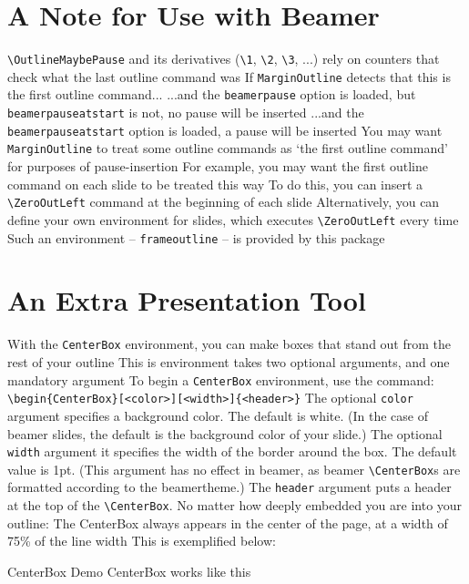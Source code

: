 \documentclass[11pt]{article}
\begin{document}
\section{A Note for Use with Beamer}\label{sec:frameoutline}
\1 \verb+\OutlineMaybePause+ and its derivatives (\verb+\1+, \verb+\2+, \verb+\3+, ...) rely on counters that check what the last outline command was
	\2 If \verb+MarginOutline+ detects that this is the first outline command...
		\3 ...and the \verb+beamerpause+ option is loaded, but \verb+beamerpauseatstart+ is not, no pause will be inserted
		\3 ...and the \verb+beamerpauseatstart+ option is loaded, a pause will be inserted
\1 You may want \verb+MarginOutline+ to treat some outline commands as `the first outline command' for purposes of pause-insertion
	\2 For example, you may want the first outline command on each slide to be treated this way
	\2 To do this, you can insert a \verb+\ZeroOutLeft+ command at the beginning of each slide
		\3 Alternatively, you can define your own environment for slides, which executes \verb+\ZeroOutLeft+ every time
		\3 Such an environment -- \verb+frameoutline+ -- is provided by this package

			
\section{An Extra Presentation Tool}\label{sec: centerbox}
\1 With the \verb+CenterBox+ environment, you can make boxes that stand out from the rest of your outline
	\2 This is environment takes two optional arguments, and one mandatory argument
\1 To begin a \verb+CenterBox+ environment, use the command:\\\verb+\begin{CenterBox}[<color>][<width>]{<header>}+
	\2 The optional \texttt{color} argument specifies a background color. The default is white.
		\3 (In the case of beamer slides, the default is the background color of your slide.)
	\2 The optional \texttt{width} argument it specifies the width of the border around the box. The default value is 1pt.
		\3 (This argument has no effect in beamer, as beamer \verb+\CenterBox+s are formatted according to the beamertheme.)
	\2 The \texttt{header} argument puts a header at the top of the \verb+\CenterBox+.
\1 No matter how deeply embedded you are into your outline:
	\2 The CenterBox always appears in the center of the page, at a width of 75\% of the line width
		\3 This is exemplified below:
		\begin{CenterBox}[green!25][3pt]{CenterBox Demo}
			CenterBox works like this			
		\end{CenterBox}
		
\end{document}
